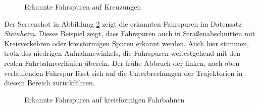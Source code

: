 \begin{figure}[H]
    \centering
    \caption{Erkannte Fahrspuren auf Kreuzungen}
    \label{fig:results_lanes2}
\end{figure}

Der Screenshot in Abbildung \ref{fig:results_lanes3} zeigt die erkannten Fahrspuren im Datensatz \textit{Steinheim}.
Dieses Beispiel zeigt, dass Fahrspuren auch in Straßenabschnitten mit Kreisverkehren oder kreisförmigen Spuren
erkannt werden. Auch hier stimmen, trotz des niedrigen Aufnahmewinkels, die Fahrspuren weitestgehend
mit den realen Fahrbahnverläufen überein. Der frühe Abbruch der linken, nach oben verlaufenden Fahrspur
lässt sich auf die Unterbrechungen der Trajektorien in diesem Bereich zurückführen.

\begin{figure}[H]
    \centering
    \caption{Erkannte Fahrspuren auf kreisförmigen Fahrbahnen}
    \label{fig:results_lanes3}
\end{figure}

